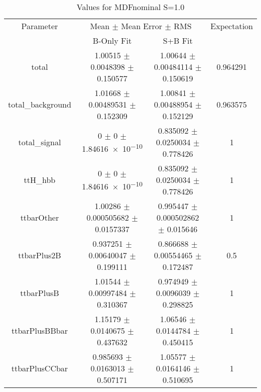 \begin{table}
\centering
\caption{Values for MDFnominal S=1.0}
\begin{tabular}{cccc}
\toprule
Parameter & \multicolumn{2}{c}{Mean $\pm$ Mean Error $\pm$ RMS} & Expectation\\
 & B-Only Fit & S+B Fit & \\
\midrule
total & \num{1.00515} $\pm$ \num{0.0048398} $\pm$ \num{0.150577} & \num{1.00644} $\pm$ \num{0.00484114} $\pm$ \num{0.150619} & \num{0.964291}\\
total\_background & \num{1.01668} $\pm$ \num{0.00489531} $\pm$ \num{0.152309} & \num{1.00841} $\pm$ \num{0.00488954} $\pm$ \num{0.152129} & \num{0.963575}\\
total\_signal & \num{0} $\pm$ \num{0} $\pm$ \num{1.84616e-10} & \num{0.835092} $\pm$ \num{0.0250034} $\pm$ \num{0.778426} & \num{1}\\
ttH\_hbb & \num{0} $\pm$ \num{0} $\pm$ \num{1.84616e-10} & \num{0.835092} $\pm$ \num{0.0250034} $\pm$ \num{0.778426} & \num{1}\\
ttbarOther & \num{1.00286} $\pm$ \num{0.000505682} $\pm$ \num{0.0157337} & \num{0.995447} $\pm$ \num{0.000502862} $\pm$ \num{0.015646} & \num{1}\\
ttbarPlus2B & \num{0.937251} $\pm$ \num{0.00640047} $\pm$ \num{0.199111} & \num{0.866688} $\pm$ \num{0.00554465} $\pm$ \num{0.172487} & \num{0.5}\\
ttbarPlusB & \num{1.01544} $\pm$ \num{0.00997484} $\pm$ \num{0.310367} & \num{0.974949} $\pm$ \num{0.0096039} $\pm$ \num{0.298825} & \num{1}\\
ttbarPlusBBbar & \num{1.15179} $\pm$ \num{0.0140675} $\pm$ \num{0.437632} & \num{1.06546} $\pm$ \num{0.0144784} $\pm$ \num{0.450415} & \num{1}\\
ttbarPlusCCbar & \num{0.985693} $\pm$ \num{0.0163013} $\pm$ \num{0.507171} & \num{1.05577} $\pm$ \num{0.0164146} $\pm$ \num{0.510695} & \num{1}\\
\bottomrule
\end{tabular}
\end{table}